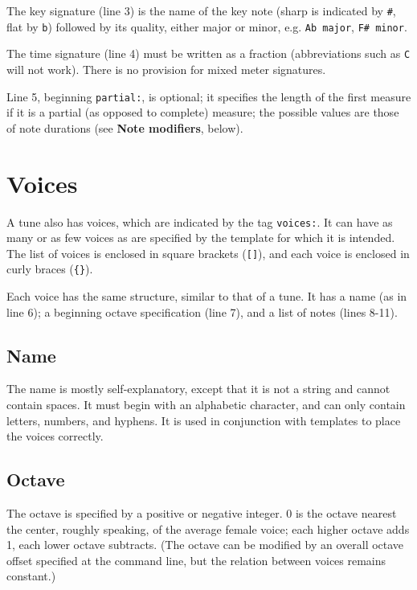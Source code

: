 \documentclass{article}
\begin{document}
The key signature (line 3) is the name of the key note (sharp is
indicated by \texttt{\#}, flat by \texttt{b}) followed by its quality,
either major or minor, e.g. \texttt{Ab major}, \texttt{F\# minor}.

The time signature (line 4) must be written as a fraction
(abbreviations such as \texttt{C} will not work).  There is no
provision for mixed meter signatures.

Line 5, beginning \texttt{partial:}, is optional; it specifies the
length of the first measure if it is a partial (as opposed to
complete) measure; the possible values are those of note durations
(see \textbf{Note modifiers}, below).

\section{Voices}

A tune also has voices, which are indicated by the tag
\texttt{voices:}.  It can have as many or as few voices as are
specified by the template for which it is intended.  The list of
voices is enclosed in square brackets (\texttt{{[]}}), and each voice
is enclosed in curly braces (\texttt{\{\}}).

Each voice has the same structure, similar to that of a tune.  It has
a name (as in line 6); a beginning octave specification (line 7), and
a list of notes (lines 8-11).

\subsection{Name}

The name is mostly self-explanatory, except that it is not a string
and cannot contain spaces.  It must begin with an alphabetic
character, and can only contain letters, numbers, and hyphens.  It is
used in conjunction with templates to place the voices correctly.

\subsection{Octave}

The octave is specified by a positive or negative integer.  0 is the
octave nearest the center, roughly speaking, of the average female
voice; each higher octave adds 1, each lower octave subtracts.  (The
octave can be modified by an overall octave offset specified at the
command line, but the relation between voices remains constant.)
\end{document}
